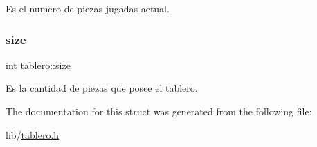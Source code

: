 Es el numero de piezas jugadas actual. \mbox{\label{structtablero_aa9bfe1c2bcb2523f1857ac6ad0ede0aa}} 
\subsubsection{\texorpdfstring{size}{size}}
{\footnotesize\ttfamily int tablero\+::size}

Es la cantidad de piezas que posee el tablero. 

The documentation for this struct was generated from the following file\+:\begin{DoxyCompactItemize}
\item 
lib/\hyperlink{tablero_8h}{tablero.\+h}\end{DoxyCompactItemize}
